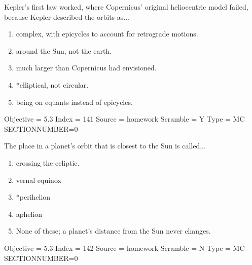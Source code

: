 \documentclass[11pt]{article}
\begin{document}
\begin{enumerate}
\begin{minipage}{\textwidth}
\begin{minipage}{\textwidth}
\item Kepler's first law worked, where Copernicus' original heliocentric model failed, because Kepler described the orbits as...
\begin{enumerate} 
\setlength{\itemsep}{1pt} 
\setlength{\parskip}{0pt} 
\setlength{\parsep}{0pt}
\setlength{\multicolsep}{1pt} 
\item complex, with epicycles to account for retrograde motions.
\item around the Sun, not the earth.
\item much larger than Copernicus had envisioned.
\item *elliptical, not circular.
\item being on equants instead of epicycles.
\end{enumerate} 
Objective = 5.3
Index = 141
Source = homework
Scramble = Y
Type = MC
SECTIONNUMBER=0
\end{minipage}
\end{minipage}
\vskip 0.20in

\begin{minipage}{\textwidth}
\begin{minipage}{\textwidth}
\item The place in a planet's orbit that is closest to the Sun is called...
\begin{enumerate} 
\setlength{\itemsep}{1pt} 
\setlength{\parskip}{0pt} 
\setlength{\parsep}{0pt}
\setlength{\multicolsep}{1pt} 
\item crossing the ecliptic.
\item vernal equinox
\item *perihelion
\item aphelion
\item None of these; a planet's distance from the Sun never changes.
\end{enumerate} 
Objective = 5.3
Index = 142
Source = homework
Scramble = N
Type = MC
SECTIONNUMBER=0
\end{minipage}
\end{minipage}
\vskip 0.20in


\end{enumerate}
\end{document}
